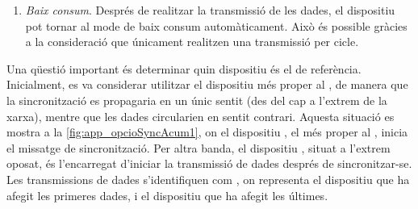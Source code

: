 \documentclass{tfgitic}[2024/07/01]
\begin{document}
{\begin{enumerate}
    Aquest mecanisme és important, ja que evita perdre les dades de tots els dispositius si un falla. A més, afegeix un mecanisme de detecció d'errors: si existeixen 10 dispositius, però només rebem 5 valors de dades, podem assegurar que, com a mínim, hi ha hagut un error en la transmissió entre els dispositius 6 i 5. Si no hi hagués hagut aquest error, el dispositiu 5 hauria rebut les dades del dispositiu 6, hi hauria afegit les seves i, per tant, hauríem rebut com a mínim 6 valors de dades.
    \item \emph{Baix consum}. Després de realitzar la transmissió de les dades, el dispositiu pot tornar al mode de baix consum automàticament. Això és possible gràcies a la consideració que únicament realitzen una transmissió per cicle.
\end{enumerate}


Una qüestió important és determinar quin dispositiu és el de referència. Inicialment, es va considerar utilitzar el dispositiu més proper al , de manera que la sincronització es propagaria en un únic sentit (des del  cap a l'extrem de la xarxa), mentre que les dades circularien en sentit contrari. Aquesta situació es mostra a la \autoref{fig:app_opcioSyncAcum1}, on el dispositiu , el més proper al , inicia el missatge de sincronització. Per altra banda, el dispositiu , situat a l'extrem oposat, és l'encarregat d'iniciar la transmissió de dades després de sincronitzar-se. Les transmissions de dades s'identifiquen com , on  representa el dispositiu que ha afegit les primeres dades, i  el dispositiu que ha afegit les últimes.

}
\end{document}
